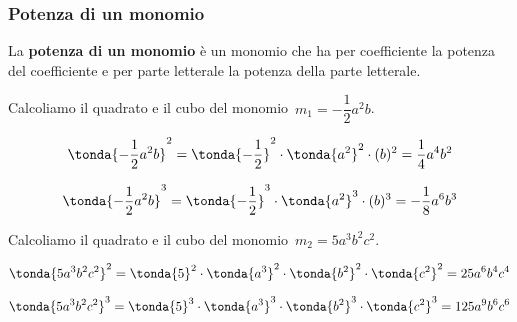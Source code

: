 
\subsubsection{Potenza di un monomio}
\label{subsubsec:monomi_potenza}

% 
% 

\begin{definizione}{}{}
La \textbf{potenza di un monomio}
è un monomio che ha per coefficiente la potenza del coefficiente e per 
parte letterale la potenza della parte letterale.
\end{definizione}

\begin{esempio}{}{}
Calcoliamo il quadrato e il cubo del 
monomio~\(m_{1}=-{\dfrac{1}{2}}a^{2}b\).

\vspace{-.5em}
\[\tonda{-{\frac{1}{2}}a^{2}b}^{2}
=\tonda{-{\frac{1}{2}}}^{2}\cdot\tonda{a^{2}}^{2}\cdot (b)^{2}
=\frac{1}{4}a^{4}b^{2}\]

\vspace{-.5em}
\[\tonda{-{\frac{1}{2}}a^{2}b}^{3}
=\tonda{-{\frac{1}{2}}}^{3}\cdot\tonda{a^{2}}^{3}\cdot (b)^{3}
=-{\frac{1}{8}}a^{6}b^{3}\]
\end{esempio}

\begin{esempio}{}{}
Calcoliamo il quadrato e il cubo del monomio~\(m_{2}=5a^{3}b^{2}c^{2}\).

\vspace{-.5em}
\[\tonda{5a^{3}b^{2}c^{2}}^{2}
=\tonda{5}^{2}\cdot \tonda{a^{3}}^{2}\cdot\tonda{b^{2}}^{2}\cdot 
\tonda{c^{2}}^{2}
=25a^{6}b^{4}c^{4}\]

\vspace{-.5em}
\[\tonda{5a^{3}b^{2}c^{2}}^{3}
=\tonda{5}^{3}\cdot \tonda{a^{3}}^{3}\cdot\tonda{b^{2}}^{3}\cdot 
\tonda{c^{2}}^{3}
=125a^{9}b^{6}c^{6}\]
\end{esempio}

